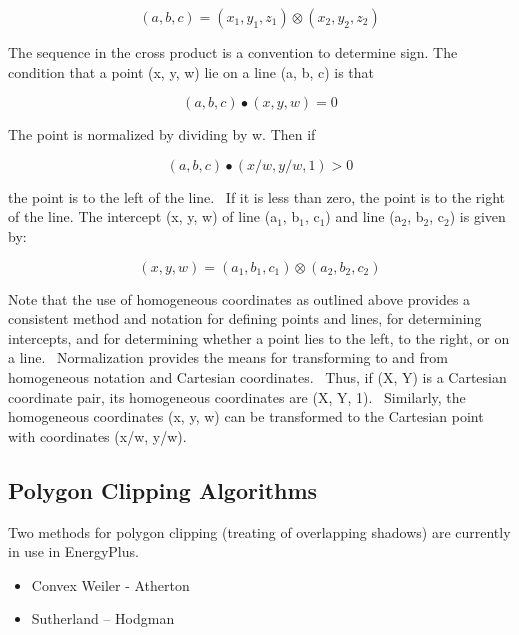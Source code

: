 \begin{equation}
(a,b,c) = ({x_1},{y_1},{z_1}) \otimes ({x_2},{y_2},{z_2})
\end{equation}

The sequence in the cross product is a convention to determine sign. The condition that a point (x, y, w) lie on a line (a, b, c) is that

\begin{equation}
(a,b,c) \bullet (x,y,w) = 0
\end{equation}

The point is normalized by dividing by w. Then if

\begin{equation}
(a,b,c) \bullet (x/w,y/w,1) > 0
\end{equation}

the point is to the left of the line.~ If it is less than zero, the point is to the right of the line. The intercept (x, y, w) of line (a\(_{1}\), b\(_{1}\), c\(_{1}\)) and line (a\(_{2}\), b\(_{2}\), c\(_{2}\)) is given by:

\begin{equation}
(x,y,w) = ({a_1},{b_1},{c_1}) \otimes ({a_2},{b_2},{c_2})
\end{equation}

Note that the use of homogeneous coordinates as outlined above provides a consistent method and notation for defining points and lines, for determining intercepts, and for determining whether a point lies to the left, to the right, or on a line.~ Normalization provides the means for transforming to and from homogeneous notation and Cartesian coordinates.~ Thus, if (X, Y) is a Cartesian coordinate pair, its homogeneous coordinates are (X, Y, 1).~ Similarly, the homogeneous coordinates (x, y, w) can be transformed to the Cartesian point with coordinates (x/w, y/w).

\subsection{Polygon Clipping Algorithms}\label{polygon-clipping-algorithms}

Two methods for polygon clipping (treating of overlapping shadows) are currently in use in EnergyPlus.

\begin{itemize}
\item
  Convex Weiler - Atherton
\item
  Sutherland -- Hodgman
\end{itemize}

